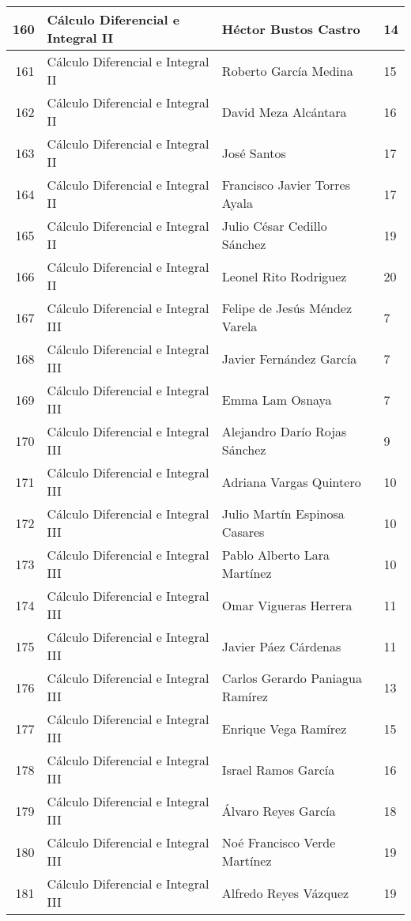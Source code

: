 \begin{table}[ht]
\begin{tabular}{rlll}
  160 & Cálculo Diferencial e Integral II & Héctor Bustos Castro & 14 \\ \hline
  161 & Cálculo Diferencial e Integral II & Roberto García Medina & 15 \\ \hline
  162 & Cálculo Diferencial e Integral II & David Meza Alcántara & 16 \\ \hline
  163 & Cálculo Diferencial e Integral II & José Santos & 17 \\ \hline
  164 & Cálculo Diferencial e Integral II & Francisco Javier Torres Ayala & 17 \\ \hline
  165 & Cálculo Diferencial e Integral II & Julio César Cedillo Sánchez & 19 \\ \hline
  166 & Cálculo Diferencial e Integral II & Leonel Rito Rodriguez & 20 \\ \hline
  167 & Cálculo Diferencial e Integral III & Felipe de Jesús Méndez Varela & 7 \\ \hline
  168 & Cálculo Diferencial e Integral III & Javier Fernández García & 7 \\ \hline
  169 & Cálculo Diferencial e Integral III & Emma Lam Osnaya & 7 \\ \hline
  170 & Cálculo Diferencial e Integral III & Alejandro Darío Rojas Sánchez & 9 \\ \hline
  171 & Cálculo Diferencial e Integral III & Adriana Vargas Quintero & 10 \\ \hline
  172 & Cálculo Diferencial e Integral III & Julio Martín Espinosa Casares & 10 \\ \hline
  173 & Cálculo Diferencial e Integral III & Pablo Alberto Lara Martínez & 10 \\ \hline
  174 & Cálculo Diferencial e Integral III & Omar Vigueras Herrera & 11 \\ \hline
  175 & Cálculo Diferencial e Integral III & Javier Páez Cárdenas & 11 \\ \hline
  176 & Cálculo Diferencial e Integral III & Carlos Gerardo Paniagua Ramírez & 13 \\ \hline
  177 & Cálculo Diferencial e Integral III & Enrique Vega Ramírez & 15 \\ \hline
  178 & Cálculo Diferencial e Integral III & Israel Ramos García & 16 \\ \hline
  179 & Cálculo Diferencial e Integral III & Álvaro Reyes García & 18 \\ \hline
  180 & Cálculo Diferencial e Integral III & Noé Francisco Verde Martínez & 19 \\ \hline
  181 & Cálculo Diferencial e Integral III & Alfredo Reyes Vázquez & 19 \\ \hline

\end{tabular}
\end{table}
